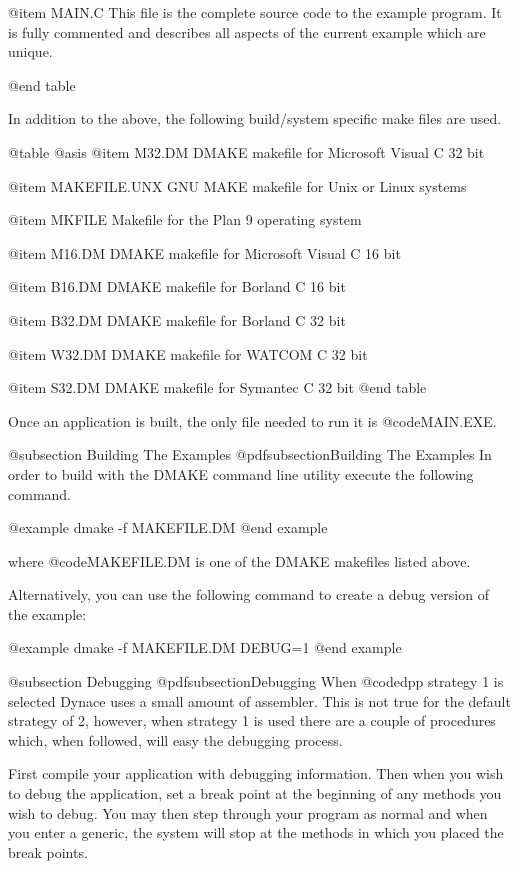 @item MAIN.C
This file is the complete source code to the example program.  It is
fully commented and describes all aspects of the current example which
are unique.

@end table


In addition to the above, the following build/system specific make 
files are used.

@table @asis
@item M32.DM
DMAKE makefile for Microsoft Visual C 32 bit

@item MAKEFILE.UNX
GNU MAKE makefile for Unix or Linux systems

@item MKFILE
Makefile for the Plan 9 operating system

@item M16.DM
DMAKE makefile for Microsoft Visual C 16 bit

@item B16.DM
DMAKE makefile for Borland C 16 bit

@item B32.DM
DMAKE makefile for Borland C 32 bit

@item W32.DM
DMAKE makefile for WATCOM C 32 bit

@item S32.DM
DMAKE makefile for Symantec C 32 bit
@end table


Once an application is built, the only file needed to run it is
@code{MAIN.EXE}.



@subsection Building The Examples
@pdfsubsection{Building The Examples}
In order to build with the DMAKE command line utility execute the
following command.

@example
dmake -f MAKEFILE.DM
@end example

where @code{MAKEFILE.DM} is one of the DMAKE makefiles listed above.

Alternatively, you can use the following command to create a debug
version of the example:

@example
dmake -f MAKEFILE.DM  DEBUG=1
@end example



@subsection Debugging
@pdfsubsection{Debugging}
When @code{dpp} strategy 1 is selected Dynace uses a small amount of
assembler.  This is not true for the default strategy of 2, however,
when strategy 1 is used there are a couple of procedures which, when
followed, will easy the debugging process.

First compile your application with debugging information.  Then when you
wish to debug the application, set a break point at the beginning of any
methods you wish to debug.  You may then step through your program as
normal and when you enter a generic, the system will stop at the
methods in which you placed the break points.

